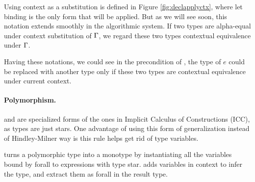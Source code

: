 Using context as a substitution is defined in Figure \ref{fig:declapplyctx}, where let binding is the only form that will be applied. But as we will see soon, this notation extends smoothly in the algorithmic system. If two types are alpha-equal under context substitution of $\Gamma$, we regard these two types contextual equivalence under $\Gamma$.

Having these notations, we could see in the precondition of , the type of $e$ could be replaced with another type only if these two types are contextual equivalence under current context.

\paragraph{Polymorphism.}  and  are specialized forms of the ones in Implicit Calculus of Constructions (ICC), as types are just stars. One advantage of using this form of generalization instead of Hindley-Milner way is this rule helps get rid of type variables.

 turns a polymorphic type into a monotype by instantiating all the variables bound by forall to expressions with type star.  adds variables in context to infer the type, and extract them as forall in the result type.
